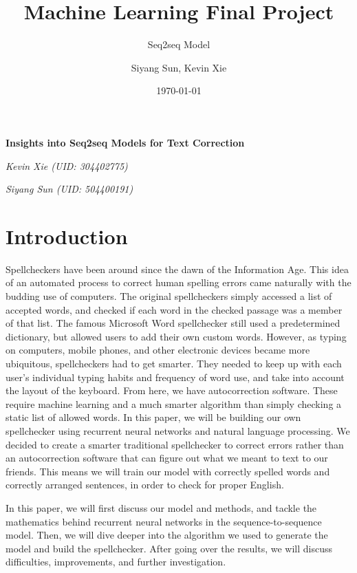 \documentclass[11pt,a4paper]{scrartcl}
\title{Machine Learning Final Project}
\subtitle{Seq2seq Model}
\author{Siyang Sun, Kevin Xie}
\date{\today}
\theoremstyle{definition}
\begin{document}
\begin{titlepage}
	\centering
	{\Huge\bfseries Insights into Seq2seq Models for Text Correction\par}
	\vspace{7cm}
	{\LARGE\itshape Kevin Xie (UID: 304402775)\par}
	\vspace{.9em}
	{\LARGE\itshape Siyang Sun (UID: 504400191)\par}
	\vspace{.9em}


	\vfill

\end{titlepage}
\tableofcontents

\section{Introduction}

Spellcheckers have been around since the dawn of the Information Age. This idea of an automated process to correct human spelling errors came naturally with the budding use of computers. The original spellcheckers simply accessed a list of accepted words, and checked if each word in the checked passage was a member of that list. The famous Microsoft Word spellchecker still used a predetermined dictionary, but allowed users to add their own custom words. However, as typing on computers, mobile phones, and other electronic devices became more ubiquitous, spellcheckers had to get smarter. They needed to keep up with each user’s individual typing habits and frequency of word use, and take into account the layout of the keyboard. From here, we have autocorrection software. These require machine learning and a much smarter algorithm than simply checking a static list of allowed words. In this paper, we will be building our own spellchecker using recurrent neural networks and natural language processing. We decided to create a smarter traditional spellchecker to correct errors rather than an autocorrection software that can figure out what we meant to text to our friends. This means we will train our model with correctly spelled words and correctly arranged sentences, in order to check for proper English.\newline

In this paper, we will first discuss our model and methods, and tackle the mathematics behind recurrent neural networks in the sequence-to-sequence model. Then, we will dive deeper into the algorithm we used to generate the model and build the spellchecker. After going over the results, we will discuss difficulties, improvements, and further investigation.
\end{document}
